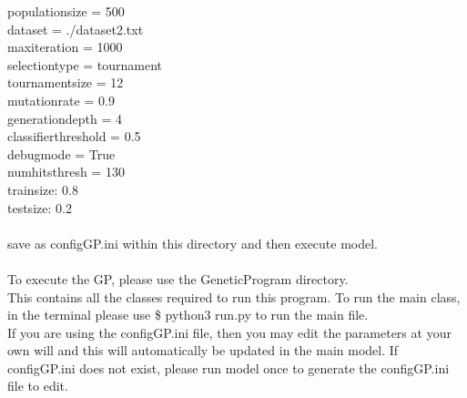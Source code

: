\documentclass[11pt]{article}
\begin{document}
population\textunderscore size = 500\\
data\textunderscore set = ./dataset2.txt\\
max\textunderscore iteration = 1000\\
selection\textunderscore type = tournament\\
tournament\textunderscore size = 12\\
mutation\textunderscore rate = 0.9\\
generation\textunderscore depth = 4\\
classifier\textunderscore threshold = 0.5\\
debug\textunderscore mode = True\\
num\textunderscore hits\textunderscore thresh = 130\\
train\textunderscore size: 0.8\\
test\textunderscore size: 0.2\\
\\
save as configGP.ini within this directory and then execute model.
\\
\\
To execute the GP, please use the GeneticProgram directory.\\
This contains all the classes required to run this program. To run the main class, in the terminal please use  \$ python3 run.py to run the main file. \\
If you are using the configGP.ini file, then you may edit the parameters at your own will and this will automatically be updated in the main model. If configGP.ini does not exist, please run model once to generate the configGP.ini file to edit. 

\newpage
\end{document}
